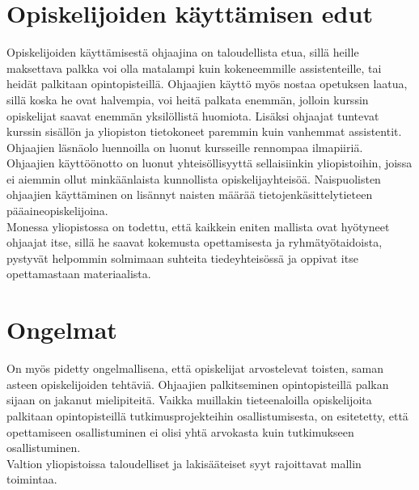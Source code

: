 \documentclass[finnish]{tktltiki2}
\theoremstyle{definition}
\theoremstyle{remark}
\begin{document}
\section{Opiskelijoiden käyttämisen edut}
Opiskelijoiden käyttämisestä ohjaajina on taloudellista etua, sillä heille maksettava palkka voi olla matalampi kuin kokeneemmille assistenteille, tai heidät palkitaan opintopisteillä. Ohjaajien käyttö myös nostaa opetuksen laatua, sillä koska he ovat halvempia, voi heitä palkata enemmän, jolloin kurssin opiskelijat saavat enemmän yksilöllistä huomiota. Lisäksi ohjaajat tuntevat kurssin sisällön ja yliopiston tietokoneet paremmin kuin vanhemmat assistentit. 
\\
Ohjaajien läsnäolo luennoilla on luonut kursseille rennompaa ilmapiiriä. Ohjaajien käyttöönotto on luonut yhteisöllisyyttä sellaisiinkin yliopistoihin, joissa ei aiemmin ollut minkäänlaista kunnollista opiskelijayhteisöä. Naispuolisten ohjaajien käyttäminen on lisännyt naisten määrää tietojenkäsittelytieteen pääaineopiskelijoina.
\\
Monessa yliopistossa on todettu, että kaikkein eniten mallista ovat hyötyneet ohjaajat itse, sillä he saavat kokemusta opettamisesta ja ryhmätyötaidoista, pystyvät helpommin solmimaan suhteita tiedeyhteisössä ja oppivat itse opettamastaan materiaalista.



\section{Ongelmat}
On myös pidetty ongelmallisena, että opiskelijat arvostelevat toisten, saman asteen opiskelijoiden tehtäviä. Ohjaajien palkitseminen opintopisteillä palkan sijaan on jakanut mielipiteitä. Vaikka muillakin tieteenaloilla opiskelijoita palkitaan opintopisteillä tutkimusprojekteihin osallistumisesta, on esitetetty, että opettamiseen osallistuminen ei olisi yhtä arvokasta kuin tutkimukseen osallistuminen.
\\
Valtion yliopistoissa taloudelliset ja lakisääteiset syyt rajoittavat mallin toimintaa. 



\end{document}
